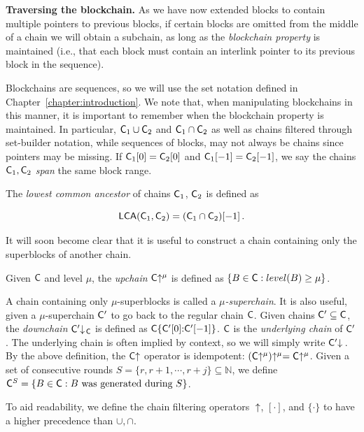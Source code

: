 

\noindent\textbf{Traversing the blockchain. }
As we have now extended blocks to contain multiple pointers to previous blocks,
if certain blocks are omitted from the middle of a chain we will obtain a
subchain, as long as the \emph{blockchain property} is maintained (i.e., that
each block must contain an interlink pointer to its previous block in the
sequence).

Blockchains are sequences, so we will use the set notation defined in
Chapter~\ref{chapter:introduction}. We note that, when manipulating blockchains
in this manner, it is important to remember when the blockchain property is
maintained. In particular, $\mathsf{C}_1 \cup \mathsf{C}_2$ and $\mathsf{C}_1 \cap \mathsf{C}_2$
as well as chains filtered through set-builder notation,
while sequences of blocks, may not always be chains since pointers may be missing.
If $\mathsf{C}_1[0] = \mathsf{C}_2[0]$ and $\mathsf{C}_1[-1]
= \mathsf{C}_2[-1]$, we say the chains $\mathsf{C}_1, \mathsf{C}_2$ \emph{span} the same
block range.

\begin{definition}
The \emph{lowest common ancestor} of chains $\mathsf{C}_1$, $\mathsf{C}_2$ is defined as

\[
\textsf{LCA}(\mathsf{C}_1, \mathsf{C}_2) = (\mathsf{C}_1 \cap \mathsf{C}_2)[-1]\,.
\]
\end{definition}

It will soon become clear that it is useful to construct a chain containing only
the superblocks of another chain.

\begin{definition}[Upchain]
Given $\mathsf{C}$ and level $\mu$, the \emph{upchain} $\mathsf{C}\negthickspace\uparrow^\mu$ is
defined as $\{B \in \mathsf{C}: level(B) \geq \mu\}$.
\end{definition}

A chain containing only $\mu$-superblocks is called a
$\mu$\emph{-superchain}. It is also useful, given a $\mu$-superchain $\mathsf{C}'$
to go back to the regular chain $\mathsf{C}$. Given chains $\mathsf{C}' \subseteq
\mathsf{C}$, the \emph{downchain} $\mathsf{C}'\negthickspace\downarrow\,\!\!_{\mathsf{C}}$ is defined as
$\mathsf{C}\{\mathsf{C}'[0]{:}\mathsf{C}'[-1]\}$. $\mathsf{C}$ is the \emph{underlying chain} of
$\mathsf{C}'$. The underlying chain is often implied by context, so we will simply
write $\mathsf{C}'\negthickspace\downarrow\,$. By the above definition, the $\mathsf{C}\negthickspace\uparrow$
operator is idempotent: $(\mathsf{C}\negthickspace\uparrow^\mu)\negthickspace\uparrow^\mu =
\mathsf{C}\negthickspace\uparrow^\mu$. Given a set of consecutive rounds $S = \{r, r + 1,
\cdots, r + j\} \subseteq \mathbb{N}$, we define $\mathsf{C}^S = \{B \in \mathsf{C}: B
\text{ was generated during } S\}$.

To aid readability, we define the chain filtering operators~ $\negthickspace\uparrow$,
$[\cdot]$, and $\{\cdot\}$ to have a higher precedence than $\cup, \cap$.
